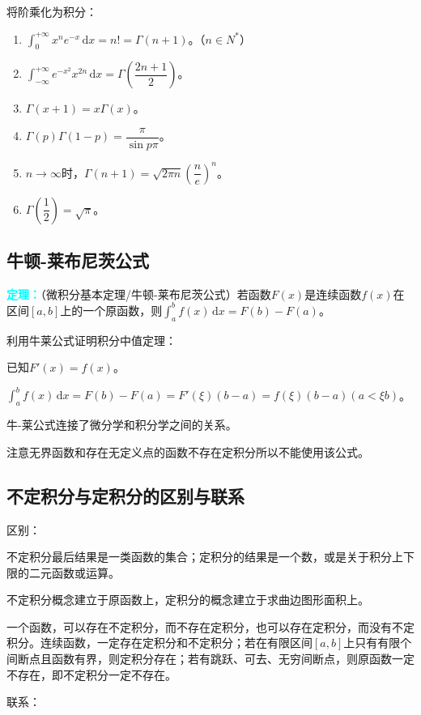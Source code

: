 \documentclass[UTF8, 12pt]{ctexart}
\begin{document}
将阶乘化为积分：

\begin{enumerate}
    \item $\int_0^{+\infty}x^ne^{-x}\,\textrm{d}x=n!=\Gamma(n+1)$。（$n\in N^*$）
    \item $\int_{-\infty}^{+\infty}e^{-x^2}x^{2n}\,\textrm{d}x=\Gamma\left(\dfrac{2n+1}{2}\right)$。
    \item $\Gamma(x+1)=x\Gamma(x)$。
    \item $\Gamma(p)\Gamma(1-p)=\dfrac{\pi}{\sin p\pi}$。
    \item $n\to\infty$时，$\Gamma(n+1)=\sqrt{2\pi n}\left(\dfrac{n}{e}\right)^n$。
    \item $\Gamma\left(\dfrac{1}{2}\right)=\sqrt{\pi}$。
\end{enumerate}

\subsection{牛顿-莱布尼茨公式}

\textcolor{aqua}{\textbf{定理：}}（微积分基本定理/牛顿-莱布尼茨公式）若函数$F(x)$是连续函数$f(x)$在区间$[a,b]$上的一个原函数，则$\int_a^bf(x)\,\textrm{d}x=F(b)-F(a)$。

利用牛莱公式证明积分中值定理：

已知$F'(x)=f(x)$。

$\int_a^bf(x)\,\textrm{d}x=F(b)-F(a)=F'(\xi)(b-a)=f(\xi)(b-a)(a<\xi b)$。

牛-莱公式连接了微分学和积分学之间的关系。

注意无界函数和存在无定义点的函数不存在定积分所以不能使用该公式。

\subsection{不定积分与定积分的区别与联系}

区别：

不定积分最后结果是一类函数的集合；定积分的结果是一个数，或是关于积分上下限的二元函数或运算。

不定积分概念建立于原函数上，定积分的概念建立于求曲边图形面积上。

一个函数，可以存在不定积分，而不存在定积分，也可以存在定积分，而没有不定积分。连续函数，一定存在定积分和不定积分；若在有限区间$[a,b]$上只有有限个间断点且函数有界，则定积分存在；若有跳跃、可去、无穷间断点，则原函数一定不存在，即不定积分一定不存在。

联系：
\end{document}
